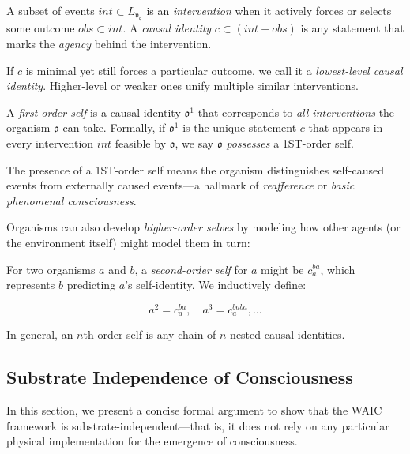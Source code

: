 \documentclass[12pt,letterpaper]{article}
\begin{document}
\begin{definition}\label{def:causal-identity}
A subset of events $int \subset L_{\mathfrak{v}_\mathfrak{o}}$ is an \textit{intervention} when it actively forces or selects some outcome $obs \subset int$. A \textit{causal identity} $c \subset (int - obs)$ is any statement that marks the \textit{agency} behind the intervention.

If $c$ is minimal yet still forces a particular outcome, we call it a \textit{lowest-level causal identity}. Higher-level or weaker ones unify multiple similar interventions.
\end{definition}

\begin{definition}
A \textit{first-order self} is a causal identity $\mathfrak{o}^1$ that corresponds to \textit{all interventions} the organism $\mathfrak{o}$ can take. Formally, if $\mathfrak{o}^1$ is the unique statement $c$ that appears in every intervention $int$ feasible by $\mathfrak{o}$, we say $\mathfrak{o}$ \textit{possesses} a 1ST-order self.
\end{definition}

The presence of a 1ST-order self means the organism distinguishes self-caused events from externally caused events---a hallmark of \textit{reafference} or \textit{basic phenomenal consciousness}.

Organisms can also develop \textit{higher-order selves} by modeling how other agents (or the environment itself) might model them in turn:

\begin{definition}
For two organisms $a$ and $b$, a \textit{second-order self} for $a$ might be $c_a^{ba}$, which represents $b$ predicting $a$'s self-identity. We inductively define:

\[
   a^2 = c_a^{ba},\quad
   a^3 = c_a^{baba},\dots
\]

In general, an $n$th-order self is any chain of $n$ nested causal identities.
\end{definition}

\subsection{Substrate Independence of Consciousness}
\label{sec:substrate-independence}

In this section, we present a concise formal argument to show that the WAIC framework is substrate-independent---that is, it does not rely on any particular physical implementation for the emergence of consciousness.
\end{document}
